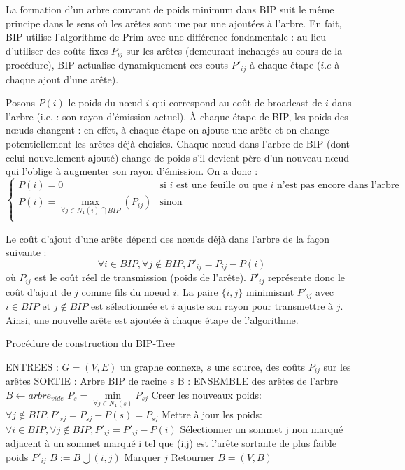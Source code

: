 La formation d'un arbre couvrant de poids minimum dans BIP suit le même principe dans le sens où les arêtes sont une par une ajoutées à l'arbre. En fait, BIP utilise l'algorithme de Prim avec une différence fondamentale : au lieu d'utiliser des coûts fixes $P_{ij}$ sur les arêtes (demeurant inchangés au cours de la procédure), BIP actualise dynamiquement ces couts $P'_{ij}$ à chaque étape ($i.e$ à chaque ajout d'une arête).

Posons $P(i)$ le poids du nœud $i$ qui correspond au coût de broadcast de $i$ dans l'arbre (i.e. : son rayon d'émission actuel). À chaque étape de BIP, les poids des nœuds changent : en effet, à chaque étape on ajoute une arête et on change potentiellement les arêtes déjà choisies. Chaque nœud dans l'arbre de BIP (dont celui nouvellement ajouté) change de poids s'il devient père d'un nouveau nœud qui l'oblige à augmenter son rayon d'émission. On a donc :
$$\begin{cases}
	P(i)=0  & \text{si $i$ est une feuille ou que $i$ n'est pas encore dans l'arbre}\\
	P(i)=\max\limits_{\forall j\in N_1(i)\bigcap BIP}(P_{ij}) & \text{sinon}\\
\end{cases}$$

Le coût d'ajout d'une arête dépend des nœuds déjà dans l'arbre de la façon suivante : 
$$ \forall i \in BIP, \forall j \notin BIP, P'_{ij}=P_{ij}-P(i)$$
où $P_{ij}$ est le coût réel de transmission (poids de l'arête). $P'_{ij}$ représente donc le coût d'ajout de $j$ comme fils du noeud $i$. La paire $\{i,j\}$ minimisant $P'_{ij}$ avec $i \in BIP$ et $j \not\in BIP$ est sélectionnée et $i$ ajuste son rayon pour transmettre à $j$. Ainsi, une nouvelle arête est ajoutée à chaque étape de l'algorithme.\\


\begin{algorithm}[h]
\caption{Procédure de construction du BIP-Tree}
\label{algo_BIP_tree}
\begin{algorithmic}
\STATE ENTREES :  $G=(V,E)$ un graphe connexe, $s$ une source, des coûts $P_{ij}$ sur les arêtes 
\STATE SORTIE : Arbre BIP de racine s
\STATE B : ENSEMBLE des arêtes de l'arbre
\STATE  $B \leftarrow arbre_{vide}$
\STATE $P_s = \min \limits_{\forall j \in N_1(s)}{P_{sj}}$
\STATE Creer les nouveaux poids: $\forall j \notin BIP, P'_{sj}=P_{sj}-P(s)=P_{sj}$
   \STATE Mettre à jour les poids:  $ \forall i \in BIP, \forall j \notin BIP, P'_{ij}=P'_{ij}-P(i)$
   \STATE Sélectionner un sommet j non marqué adjacent à un sommet marqué i tel que (i,j) est l'arête sortante de plus faible poids $P'_{ij}$
   \STATE $B := B\bigcup   {(i,j)}$
   \STATE Marquer $j$
\ENDWHILE
\STATE Retourner $B=(V,B)$
\end{algorithmic}
\end{algorithm}

